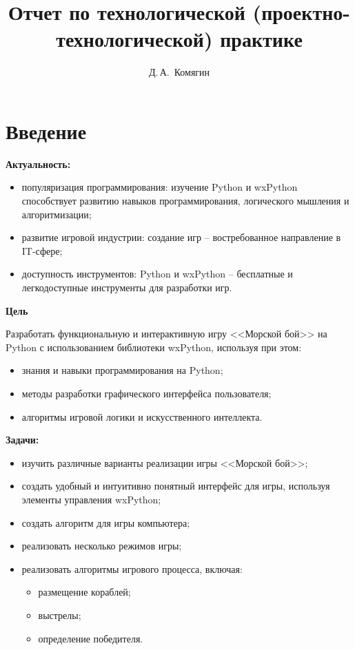 \documentclass[14pt, oneside]{altsu-report}
\title{Отчет по технологической (проектно-технологической) практике}
\author{Д.\,А.~Комягин}
\institute{Институт цифровых технологий, электроники и физики}
\date{\the\year}
\begin{document}
\maketitle

\setcounter{page}{2}
\makeabstract
\tableofcontents

\chapter*{Введение}

\textbf{Актуальность:}
\begin{itemize}
\item популяризация программирования: изучение Python и wxPython способствует развитию навыков программирования, логического мышления и алгоритмизации;
\item развитие игровой индустрии: создание игр – востребованное направление в IT-сфере;
\item доступность инструментов: Python и wxPython – бесплатные и легкодоступные инструменты для разработки игр.
\end{itemize}

\textbf{Цель}

Разработать функциональную и интерактивную игру <<Морской бой>> на Python с использованием библиотеки wxPython, используя при этом:
\begin{itemize}
\item знания и навыки программирования на Python;
\item методы разработки графического интерфейса пользователя;
\item алгоритмы игровой логики и искусственного интеллекта.
\end{itemize}

\textbf{Задачи:}

\begin{itemize}
\item изучить различные варианты реализации игры <<Морской бой>>;
\item создать удобный и интуитивно понятный интерфейс для игры, используя элементы управления wxPython;
\item создать алгоритм для игры компьютера;
\item реализовать несколько режимов игры;
\item реализовать алгоритмы игрового процесса, включая:
\begin{itemize}
    \item размещение кораблей;
    \item выстрелы;
    \item определение победителя.
\end{itemize}
\end{itemize}
\end{document}
